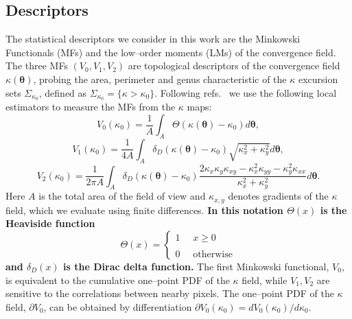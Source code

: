 \documentclass[reprint,aps,prd,superscriptaddress,showkeys,showpacs]{revtex4-1}
\begin{document}
\subsection{Descriptors}

The statistical descriptors we consider in this work are the Minkowski
Functionals (MFs) and the low--order moments (LMs) of the convergence
field. The three MFs $(V_0,V_1,V_2)$ are topological descriptors of
the convergence field $\kappa(\pmb{\theta})$, probing the area,
perimeter and genus characteristic of the $\kappa$ excursion sets
$\Sigma_{\kappa_0}$, defined as
$\Sigma_{\kappa_0}=\{\kappa>\kappa_0\}$. Following
refs.~\citep{Petri2013,MinkJan} we use the following local estimators
to measure the MFs from the $\kappa$ maps:
\begin{equation*}
\label{v0meas}
V_0(\kappa_0)=\frac{1}{A}\int_A\Theta(\kappa(\pmb{\theta})-\kappa_0)d\pmb{\theta},
\end{equation*}
\begin{equation}
\label{v1meas}
V_1(\kappa_0)=\frac{1}{4A}\int_A\delta_D(\kappa(\pmb{\theta})-\kappa_0)\sqrt{\kappa_x^2+\kappa_y^2}d\pmb{\theta},
\end{equation}
\begin{equation*}
\label{v2meas}
V_2(\kappa_0)=\frac{1}{2\pi A}\int_A\delta_D(\kappa(\pmb{\theta})-\kappa_0)\frac{2\kappa_x\kappa_y\kappa_{xy}-\kappa_x^2\kappa_{yy}-\kappa_y^2\kappa_{xx}}{\kappa_x^2+\kappa_y^2}d\pmb{\theta}.
\end{equation*}
Here $A$ is the total area of the field of view and $\kappa_{x,y}$
denotes gradients of the $\kappa$ field, which we evaluate using
finite differences. \textbf{In this notation $\Theta(x)$ is the Heaviside function}
%
\begin{equation}
\Theta(x) = 
\begin{cases}
1 \,\,\,\,\,\,\,\, x\geq0 \\ \\
0 \,\,\,\,\,\,\,\, \mathrm{otherwise}
\end{cases}
\end{equation}
%
\textbf{and $\delta_D(x)$ is the Dirac delta function.}
The first Minkowski functional, $V_0$, is
equivalent to the cumulative one--point PDF of the $\kappa$ field,
while $V_1,V_2$ are sensitive to the correlations between nearby
pixels. The one--point PDF of the $\kappa$ field, $\partial V_0$, can
be obtained by differentiation $\partial
V_0(\kappa_0)=dV_0(\kappa_0)/d\kappa_0$. 
\end{document}
